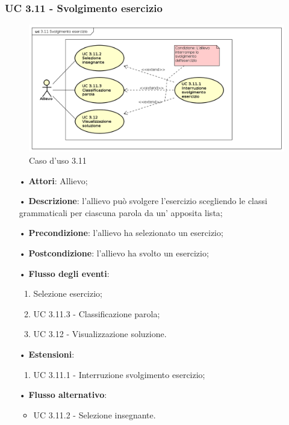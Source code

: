 \subsubsection{UC 3.11 - Svolgimento esercizio}
\begin{figure}[H]
	\centering
	\includegraphics[width=17cm]{img/UC311.png} 
	\caption{Caso d'uso 3.11}\label{fig:311}
\end{figure}
\begin{itemize}
	\item[•]\textbf{Attori}: Allievo;
	\item[•]\textbf{Descrizione}: l'allievo può svolgere l'esercizio scegliendo le classi grammaticali per ciascuna parola da un' apposita lista;
	\item[•]\textbf{Precondizione}: l'allievo ha selezionato un esercizio;
	\item[•]\textbf{Postcondizione}: l'allievo ha svolto un esercizio;
	\item[•]\textbf{Flusso degli eventi}:
	\begin{enumerate}
		\item Selezione esercizio;
		\item UC 3.11.3 - Classificazione parola;
		\item UC 3.12 - Visualizzazione soluzione.
	\end{enumerate}
	\item[•]\textbf{Estensioni}:
	\begin{enumerate}
		\item UC 3.11.1 - Interruzione svolgimento esercizio;
	\end{enumerate}
	\item[•] \textbf{Flusso alternativo}:
	\begin{itemize}
				\item UC 3.11.2 - Selezione insegnante.
	\end{itemize}
\end{itemize}

